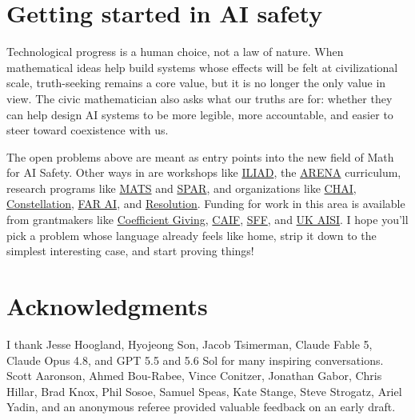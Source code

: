 \section{Getting started in AI safety}
\label{sec:conclusion}


Technological progress is a human choice, not a law of nature. When mathematical ideas help build systems whose effects will be felt at civilizational scale, truth-seeking remains a core value, but it is no longer the only value in view. The civic mathematician also asks what our truths are for: whether they can help design AI systems to be more legible, more accountable, and easier to steer toward coexistence with us.

The open problems above are meant as entry points into the new field of Math for AI Safety. Other ways in are workshops like \href{https://www.iliadconference.com}{ILIAD}, the \href{https://www.arena.education/}{ARENA} curriculum, research programs like \href{https://www.matsprogram.org/}{MATS} and \href{https://sparai.org/}{SPAR}, and organizations like \href{https://humancompatible.ai/}{CHAI}, \href{https://constellation.org/}{Constellation}, \href{https://www.far.ai/}{FAR AI}, and \href{https://resolution.org}{Resolution}. Funding for work in this area is available from grantmakers like \href{https://coefficientgiving.org/funds/navigating-transformative-ai/}{Coefficient Giving}, \href{https://www.cooperativeai.com/}{CAIF}, \href{https://survivalandflourishing.fund/}{SFF}, and \href{https://alignmentproject.aisi.gov.uk/}{UK AISI}. %
I hope you'll pick a problem whose language already feels like home, strip it down to the simplest interesting case, and start proving things!

\section*{Acknowledgments}

I thank Jesse Hoogland, Hyojeong Son, Jacob Tsimerman, Claude Fable 5, Claude Opus 4.8, and GPT 5.5 and 5.6 Sol for many inspiring conversations. Scott Aaronson, Ahmed Bou-Rabee, Vince Conitzer, Jonathan Gabor, Chris Hillar, Brad Knox, Phil Sosoe, Samuel Speas, Kate Stange, Steve Strogatz, Ariel Yadin, and an anonymous referee provided valuable feedback on an early draft.

